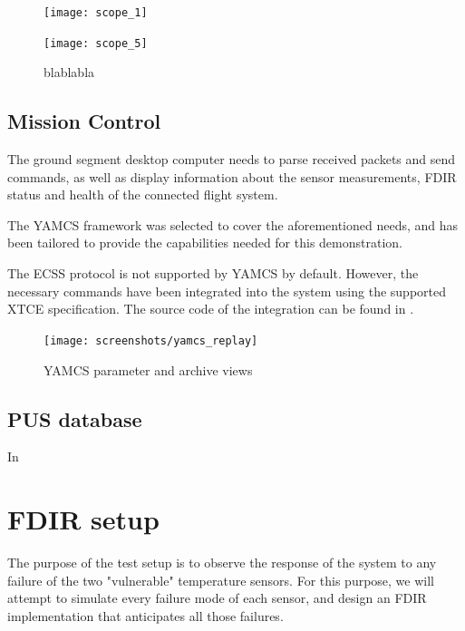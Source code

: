 \documentclass[a4paper,nobib]{tufte-book}
\begin{document}
\begin{figure}[h]
	\texttt{[image: scope\_1]}
	\label{subfig:i2c_clean}
\end{figure}

\begin{figure}[h]
	\texttt{[image: scope\_5]}
	\caption{blablabla}
	\label{subfig:i2c_dirty}
\end{figure}

\FloatBarrier

\subsection{Mission Control}

The ground segment desktop computer needs to parse received packets and send commands, as well as display information about the sensor measurements, \ac{FDIR} status and health of the connected flight system.

The \acs{YAMCS} \autocite{sela_yamcs_lightweight_2012} framework was selected to cover the aforementioned needs, and has been tailored to provide the capabilities needed for this demonstration.

The \ac{ECSS} protocol\autocite{ECSS-E-ST-70-41C} is not supported by \acs{YAMCS} by default. However, the necessary commands have been integrated into the system using the supported \ac{XTCE} specification.\autocite{simon_xtce_standard_2004} The source code of the integration can be found in .

\begin{figure}[h]
	\texttt{[image: screenshots/yamcs\_replay]}
	\caption{\acs{YAMCS} parameter and archive views}
\end{figure}

\subsection{\acs{PUS} database}

In 


\section{\ac{FDIR} setup}

The purpose of the test setup is to observe the response of the system to any failure of the two "vulnerable" temperature sensors. For this purpose, we will attempt to simulate every failure mode of each sensor, and design an \ac{FDIR} implementation that anticipates all those failures.
\end{document}
